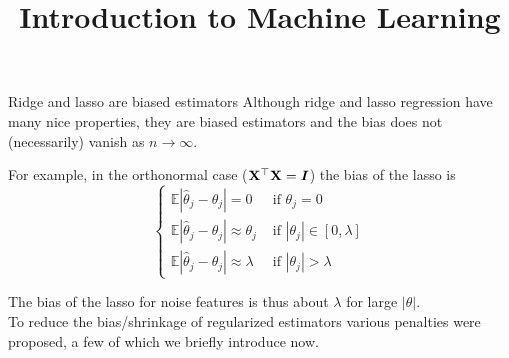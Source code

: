 \documentclass[11pt,compress,t,notes=noshow, xcolor=table]{beamer}
\title{Introduction to Machine Learning}
\date{}
\begin{document}

\begin{vbframe}{Ridge and lasso are biased estimators} 
Although ridge and lasso regression have many nice properties, they are biased estimators and the bias does not (necessarily) vanish as $n \rightarrow \infty$.\\
\vspace{0.3cm}

For example, in the orthonormal case ($\mathbf{X}^{\top}\mathbf{X}=\bm{I}$) the bias of the lasso is
$$
\begin{cases}\mathbb{E}\left|\widehat{\theta}_j-\theta_j\right|=0 & \text { if } \theta_j=0 \\ \mathbb{E}\left|\widehat{\theta}_j-\theta_j\right| \approx \theta_j & \text { if }\left|\theta_j\right| \in[0, \lambda] \\ \mathbb{E}\left|\widehat{\theta}_j-\theta_j\right| \approx \lambda & \text { if }\left|\theta_j\right|>\lambda\end{cases}
$$
\vspace{0.3cm}

The bias of the lasso for noise features is thus about $\lambda$ for large $|\theta|$.\\
\vspace{0.2cm}
To reduce the bias/shrinkage of regularized estimators various penalties were proposed, a few of which we briefly introduce now.

\end{vbframe}
\end{document}
